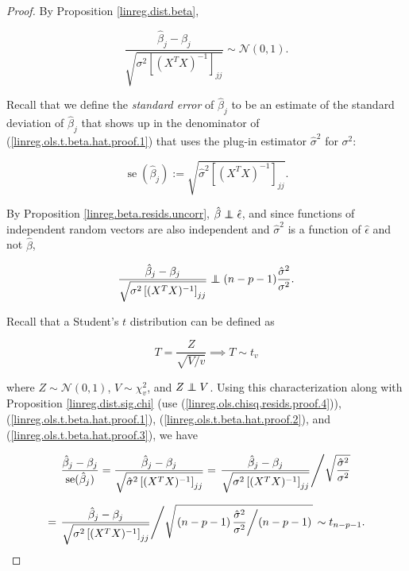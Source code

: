 \begin{proof}

By Proposition \ref{linreg.dist.beta},

\begin{equation}\label{linreg.ols.t.beta.hat.proof.1}
\frac{\hat{\beta}_j - \beta_j}{\sqrt{ \sigma^2 \left[ (X^TX)^{-1} \right]_{jj} }}  \sim  \mathcal{N} \left(0, 1 \right).
\end{equation}

Recall that we define the \textit{standard error} of \(\hat{\beta}_j\) to be an estimate of the standard deviation of \(\hat{\beta}_j\) that shows up in the denominator of (\ref{linreg.ols.t.beta.hat.proof.1}) that uses the plug-in estimator \(\hat{\sigma}^2\) for \(\sigma^2\): 

\begin{equation}\label{linreg.ols.t.beta.hat.proof.2}
\operatorname{se}(\hat{\beta}_j) :=  \sqrt{ \hat{\sigma}^2 \left[ (X^TX)^{-1} \right]_{jj} }.
\end{equation}

By Proposition \ref{linreg.beta.resids.uncorr}, \(\hat{\beta} \indep \hat{\epsilon}\), and since functions of independent random vectors are also independent and \(\hat{\sigma}^2\) is a function of \(\hat{\epsilon}\) and not \(\hat{\beta}\), 

\begin{equation}\label{linreg.ols.t.beta.hat.proof.3}
\frac{\hat{\beta}_j - \beta_j}{\sqrt{ \sigma^2 \left[ (X^TX)^{-1} \right]_{jj} }}   \indep (n - p - 1) \frac{ \hat{\sigma}^2}{\sigma^2} .
\end{equation}

Recall that a Student's \(t\) distribution can be defined as

\[
T = \frac{Z}{\sqrt{V/v}} \implies T \sim t_v
\]

where \(Z \sim \mathcal{N}(0,1)\), \(V \sim \chi_v^2\), and \(Z \indep V\). Using this characterization along with Proposition \ref{linreg.dist.sig.chi} (use (\ref{linreg.ols.chisq.resids.proof.4})),(\ref{linreg.ols.t.beta.hat.proof.1}), (\ref{linreg.ols.t.beta.hat.proof.2}), and (\ref{linreg.ols.t.beta.hat.proof.3}), we have

\[
\frac{\hat{\beta}_j - \beta_j}{ \operatorname{se}(\hat{\beta}_j)} = \frac{\hat{\beta}_j - \beta_j}{  \sqrt{ \hat{\sigma}^2 \left[ (X^TX)^{-1} \right]_{jj} } }  
= \left. \frac{\hat{\beta}_j - \beta_j}{\sqrt{ \sigma^2 \left[ (X^TX)^{-1} \right]_{jj} }}  \middle/  \sqrt{ \frac{ \hat{\sigma}^2}{\sigma^2} } \right. 
\]

\[
= \left. \frac{\hat{\beta}_j - \beta_j}{\sqrt{ \sigma^2 \left[ (X^TX)^{-1} \right]_{jj} }}  \middle/   \sqrt{ \left. \left(n - p - 1 \right) \frac{ \hat{\sigma}^2}{\sigma^2} \middle/ (n - p - 1) \right.} \right. 
\sim t_{n - p - 1}.
\]


\end{proof}





